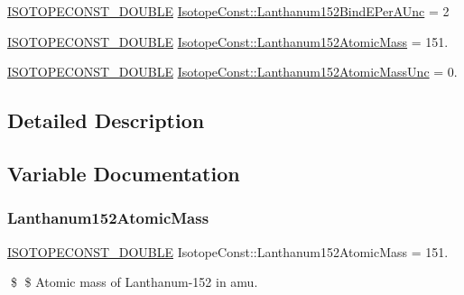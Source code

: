 \begin{DoxyCompactItemize}
\mbox{\hyperlink{group___isotope_const-_macros_ga8f45a7272ce02c0b4c65c44636ed719a}{I\+S\+O\+T\+O\+P\+E\+C\+O\+N\+S\+T\+\_\+\+D\+O\+U\+B\+LE}} \mbox{\hyperlink{group___isotope_const-_lanthanum-_la152_gabf149b400d2c55ab7a37b290188f5887}{Isotope\+Const\+::\+Lanthanum152\+Bind\+E\+Per\+A\+Unc}} = 2
\item 
\mbox{\hyperlink{group___isotope_const-_macros_ga8f45a7272ce02c0b4c65c44636ed719a}{I\+S\+O\+T\+O\+P\+E\+C\+O\+N\+S\+T\+\_\+\+D\+O\+U\+B\+LE}} \mbox{\hyperlink{group___isotope_const-_lanthanum-_la152_ga0c84c2905699bc4f5566cb837b8f6f85}{Isotope\+Const\+::\+Lanthanum152\+Atomic\+Mass}} = 151.
\item 
\mbox{\hyperlink{group___isotope_const-_macros_ga8f45a7272ce02c0b4c65c44636ed719a}{I\+S\+O\+T\+O\+P\+E\+C\+O\+N\+S\+T\+\_\+\+D\+O\+U\+B\+LE}} \mbox{\hyperlink{group___isotope_const-_lanthanum-_la152_ga4f935873730f77cb1de03500f5cbc178}{Isotope\+Const\+::\+Lanthanum152\+Atomic\+Mass\+Unc}} = 0.
\end{DoxyCompactItemize}


\subsection{Detailed Description}


\subsection{Variable Documentation}
\mbox{\label{group___isotope_const-_lanthanum-_la152_ga0c84c2905699bc4f5566cb837b8f6f85}} 
\subsubsection{\texorpdfstring{Lanthanum152\+Atomic\+Mass}{Lanthanum152AtomicMass}}
{\footnotesize\ttfamily \mbox{\hyperlink{group___isotope_const-_macros_ga8f45a7272ce02c0b4c65c44636ed719a}{I\+S\+O\+T\+O\+P\+E\+C\+O\+N\+S\+T\+\_\+\+D\+O\+U\+B\+LE}} Isotope\+Const\+::\+Lanthanum152\+Atomic\+Mass = 151.}

\$ \$ Atomic mass of Lanthanum-\/152 in amu. \mbox{\label{group___isotope_const-_lanthanum-_la152_ga4f935873730f77cb1de03500f5cbc178}} 
